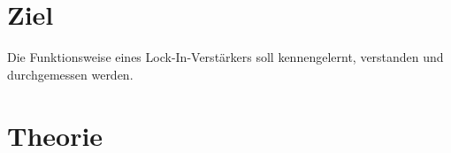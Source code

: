 \section{Ziel}
\label{sec:Ziel}

Die Funktionsweise eines Lock-In-Verstärkers soll kennengelernt, verstanden und durchgemessen werden. 

\section{Theorie}
\label{sec:Theorie}


